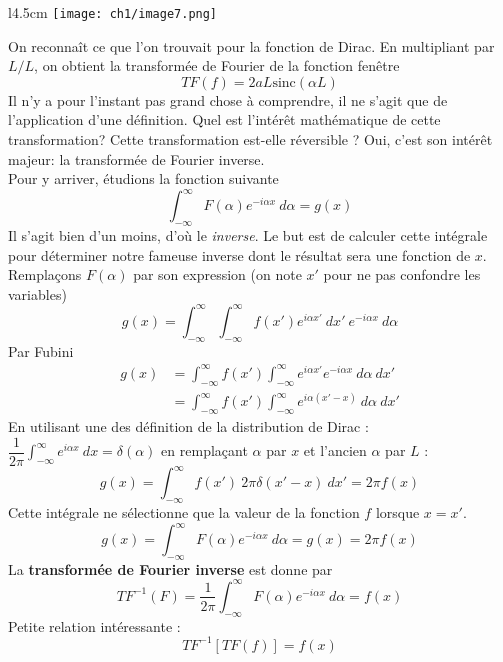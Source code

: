 \begin{wrapfigure}[8]{l}{4.5cm}
\vspace{-25mm}
\texttt{[image: ch1/image7.png]}
\end{wrapfigure}
On reconnaît ce que l'on trouvait pour la fonction de Dirac. En multipliant par $L/L$, on obtient 
la transformée de Fourier de la fonction fenêtre
\begin{equation}
TF(f) = 2aL\text{sinc}(\alpha L)
\end{equation}
Il n'y a pour l'instant pas grand chose à comprendre, il ne s'agit que de l'application d'une 
définition. Quel est l'intérêt mathématique de cette transformation? Cette transformation est-elle
réversible ? Oui, c'est son intérêt majeur: la transformée de Fourier inverse.\\
Pour y arriver, étudions la fonction suivante
\begin{equation}
\int_{-\infty}^\infty F(\alpha)e^{-i\alpha x}\ d\alpha  = g(x)
\end{equation}
\danger Il s'agit bien d'un moins, d'où le \textit{inverse}. Le but est de calculer cette intégrale 
pour déterminer notre fameuse inverse dont le résultat sera une fonction de $x$. Remplaçons $F(\alpha)$ 
par son expression (on note $x'$ pour ne pas confondre les variables)
\begin{equation}
g(x)= \int_{-\infty}^\infty \int_{-\infty}^\infty  f(x')e^{i\alpha x'}\ dx'\ e^{-i\alpha x}\ d\alpha
\end{equation}
Par Fubini
\begin{equation}
\begin{array}{ll}
g(x) &= \int_{-\infty}^\infty  f(x') \int_{-\infty}^\infty  e^{i\alpha x'}e^{-i\alpha x}\ d\alpha\ dx'\\
&= \int_{-\infty}^\infty  f(x') \int_{-\infty}^\infty  e^{i\alpha (x'-x)}\ d\alpha\ dx'
\end{array}
\end{equation}
En utilisant une des définition de la distribution de Dirac : $\dfrac{1}{2\pi}\int_{-\infty}^\infty 
e^{i\alpha x}\ dx  = \delta(\alpha)$ en remplaçant $\alpha$ par $x$ et l'ancien $\alpha$ par $L$ :
\begin{equation}
g(x) = \int_{-\infty}^\infty  f(x')\ 2\pi\delta(x'-x)\ dx' = 2\pi f(x)
\end{equation}
Cette intégrale ne sélectionne que la valeur de la fonction $f$ lorsque $x=x'$. 
\begin{equation}
g(x) = \int_{-\infty}^\infty F(\alpha)e^{-i\alpha x}\ d\alpha  = g(x) = 2\pi f(x)
\end{equation}
La \textbf{transformée de Fourier inverse} est donne par
\begin{equation}
TF^{-1}(F) = \frac{1}{2\pi}\int_{-\infty}^\infty F(\alpha)e^{-i\alpha x}\ d\alpha = f(x)
\end{equation}
Petite relation intéressante :
\begin{equation}
TF^{-1}[TF(f)] = f(x)
\end{equation}

